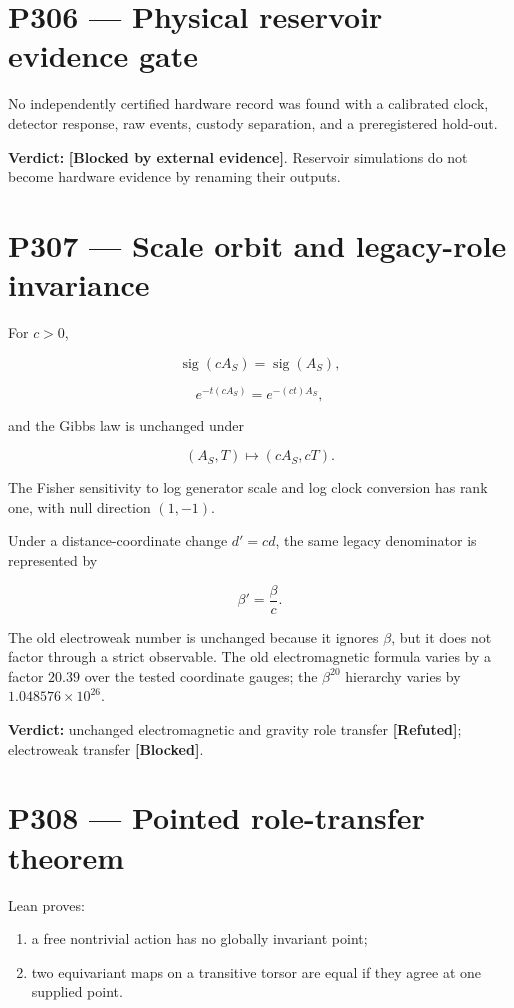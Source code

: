 \documentclass[11pt,a4paper,openany]{report}
\newcommand{\statusRefuted}{\textcolor{finred}{[Refuted]}}
\begin{document}
\section{P306 --- Physical reservoir evidence gate}

No independently certified hardware record was found with a calibrated clock, detector response, raw events, custody separation, and a preregistered hold-out.

\textbf{Verdict:} \textbf{[Blocked by external evidence]}. Reservoir simulations do not become hardware evidence by renaming their outputs.

\section{P307 --- Scale orbit and legacy-role invariance}

For \(c>0\),

\[
\operatorname{sig}(cA_S)=\operatorname{sig}(A_S),
\]

\[
e^{-t(cA_S)}=e^{-(ct)A_S},
\]

and the Gibbs law is unchanged under

\[
(A_S,T)\mapsto(cA_S,cT).
\]

The Fisher sensitivity to log generator scale and log clock conversion has rank one, with null direction \((1,-1)\).

Under a distance-coordinate change \(d'=cd\), the same legacy denominator is represented by

\[
\beta'=\frac{\beta}{c}.
\]

The old electroweak number is unchanged because it ignores \(\beta\), but it does not factor through a strict observable. The old electromagnetic formula varies by a factor \(20.39\) over the tested coordinate gauges; the \(\beta^{20}\) hierarchy varies by \(1.048576\times10^{26}\).

\textbf{Verdict:} unchanged electromagnetic and gravity role transfer \textbf{\statusRefuted{}}; electroweak transfer \textbf{[Blocked]}.

\section{P308 --- Pointed role-transfer theorem}

Lean proves:

\begin{enumerate}
\item 
a free nontrivial action has no globally invariant point;

\item 
two equivariant maps on a transitive torsor are equal if they agree at one supplied point.

\end{enumerate}
\end{document}
